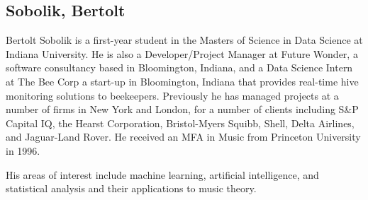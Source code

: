 \subsection{Sobolik, Bertolt}

Bertolt Sobolik is a first-year student in the Masters of Science in
Data Science at Indiana University. He is also a Developer/Project
Manager at Future Wonder, a software consultancy based in Bloomington,
Indiana, and a Data Science Intern at The Bee Corp a start-up in
Bloomington, Indiana that provides real-time hive monitoring solutions
to beekeepers. Previously he has managed projects at a number of firms
in New York and London, for a number of clients including S&P Capital
IQ, the Hearst Corporation, Bristol-Myers Squibb, Shell, Delta
Airlines, and Jaguar-Land Rover. He received an MFA in Music from
Princeton University in 1996.

His areas of interest include machine learning, artificial
intelligence, and statistical analysis and their applications to music
theory.
